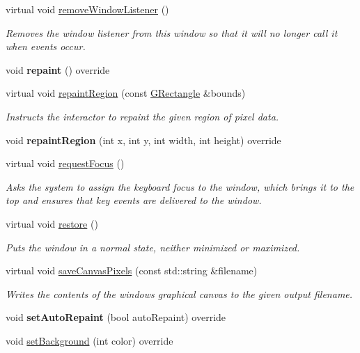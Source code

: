 \begin{DoxyCompactItemize}
virtual void \mbox{\hyperlink{classsgl_1_1GWindow_ab1ea252520cc160b329cfb5b038add83}{remove\+Window\+Listener}} ()
\begin{DoxyCompactList}\small\item\em Removes the window listener from this window so that it will no longer call it when events occur. \end{DoxyCompactList}\item 
void {\bfseries repaint} () override
\item 
virtual void \mbox{\hyperlink{classsgl_1_1GDrawingSurface_a769c46fb3e1004aec76e8b0adfa42aa6}{repaint\+Region}} (const \mbox{\hyperlink{structsgl_1_1GRectangle}{G\+Rectangle}} \&bounds)
\begin{DoxyCompactList}\small\item\em Instructs the interactor to repaint the given region of pixel data. \end{DoxyCompactList}\item 
void {\bfseries repaint\+Region} (int x, int y, int width, int height) override
\item 
virtual void \mbox{\hyperlink{classsgl_1_1GWindow_a519fb2ac767f8b2febbb50b898b8c8cb}{request\+Focus}} ()
\begin{DoxyCompactList}\small\item\em Asks the system to assign the keyboard focus to the window, which brings it to the top and ensures that key events are delivered to the window. \end{DoxyCompactList}\item 
virtual void \mbox{\hyperlink{classsgl_1_1GWindow_afd3595051be2709847c2de4352f27cf5}{restore}} ()
\begin{DoxyCompactList}\small\item\em Puts the window in a normal state, neither minimized or maximized. \end{DoxyCompactList}\item 
virtual void \mbox{\hyperlink{classsgl_1_1GWindow_aba99f6a53d9bb0493e7fc3ead6a2e4a3}{save\+Canvas\+Pixels}} (const std\+::string \&filename)
\begin{DoxyCompactList}\small\item\em Writes the contents of the window\textquotesingle{}s graphical canvas to the given output filename. \end{DoxyCompactList}\item 
void {\bfseries set\+Auto\+Repaint} (bool auto\+Repaint) override
\item 
void \mbox{\hyperlink{classsgl_1_1GWindow_a10d305826534b55561ea88730fc9f6cd}{set\+Background}} (int color) override

\end{DoxyCompactItemize}
